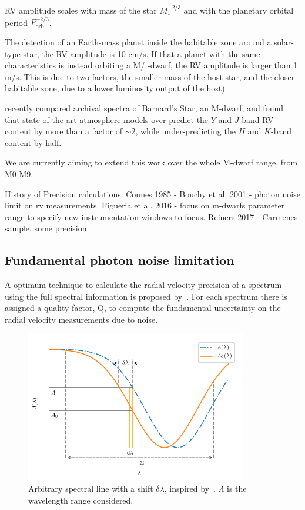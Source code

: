 RV amplitude scales with mass of the star $M_\star^{-2/3}$ and with the planetary orbital period $P_\textrm{orb}^{-2/3}$.

The detection of an Earth-mass planet inside the habitable zone around a solar-type star, the RV amplitude is 10 cm/s. If that a planet with the same characteristics is instead orbiting a M/ -dwarf, the RV amplitude is larger than 1 m/s. This is due to two factors, the smaller mass of the host star, and the closer habitable zone, due to a lower luminosity output of the host)

\citet{artigau_optical_2018} recently compared archival spectra of Barnard's Star, an M-dwarf, and found that state-of-the-art atmosphere models over-predict the $Y$ and $J$-band RV content by more than a factor of $\sim$$2$, while under-predicting the $H$ and $K$-band content by half.

We are currently aiming to extend this work over the whole M-dwarf range, from M0-M9.


History of Precision calculations:
Connes 1985 -
Bouchy et al. 2001  - photon noise limit on rv measurements.   
Figueria et al. 2016 - focus on m-dwarfs parameter range to specify new instrumentation windows to focus.
Reiners 2017 -  Carmenes sample. some precision



\subsection{Fundamental photon noise limitation}
A optimum technique to calculate the radial velocity precision of a spectrum using the full spectral information is proposed by~\citet{Connes1985}. For each spectrum there is assigned a quality factor, Q, to compute the fundamental uncertainty on the radial velocity measurements due to noise. 

\begin{figure}
    \centering
    \includegraphics[width=0.7\linewidth]{figures/precision_derivation.png}
    \caption{Arbitrary spectral line with a shift $\delta \lambda$, inspired by~\citet{Connes1985}.  \(\Lambda\) is the wavelength range considered.}
    \label{fig:precisionderivation}
\end{figure}

